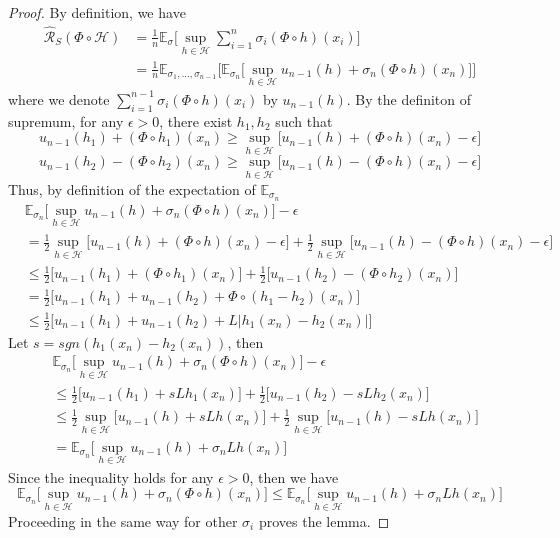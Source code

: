 \begin{proof}
	By definition, we have
	\begin{align}
	\hat{\mathcal{R}}_S(\Phi \circ \mathcal{H}) &= \frac{1}{n} \mathbb{E}_{\sigma} \bigg[\sup_{h \in \mathcal{H}} \sum_{i=1}^{n} \sigma_i(\Phi \circ h)(x_i)\bigg] \\
	&= \frac{1}{n} \mathbb{E}_{\sigma_1,...,\sigma_{n-1}} \bigg[\mathbb{E}_{\sigma_n} \big[ \sup_{h \in \mathcal{H}} u_{n-1}(h) + \sigma_n(\Phi \circ h)(x_n)\big]\bigg]
	\end{align}
	where we denote $\sum_{i=1}^{n-1} \sigma_i(\Phi \circ h)(x_i)$ by $u_{n-1}(h)$. By the definiton of supremum, for any $\epsilon>0$, there exist $h_1, h_2$ such that
	\begin{equation}
	u_{n-1}(h_1) + (\Phi \circ h_1)(x_n) \geq \sup_{h \in \mathcal{H}} \big[u_{n-1}(h) + (\Phi \circ h)(x_n)- \epsilon \big] 
	\end{equation}
	\begin{equation}
	u_{n-1}(h_2) - (\Phi \circ h_2)(x_n) \geq \sup_{h \in \mathcal{H}} \big[u_{n-1}(h) - (\Phi \circ h)(x_n)- \epsilon \big] 
	\end{equation}
	Thus, by definition of the expectation of $\mathbb{E}_{\sigma_n}$
	\begin{align}
	& \mathbb{E}_{\sigma_n} \big[ \sup_{h \in \mathcal{H}} u_{n-1}(h) + \sigma_n(\Phi \circ h)(x_n)\big] -\epsilon \\
	&= \frac{1}{2}\sup_{h \in \mathcal{H}} \big[u_{n-1}(h) + (\Phi \circ h)(x_n)  -\epsilon \big] + \frac{1}{2}\sup_{h \in \mathcal{H}} \big[u_{n-1}(h) - (\Phi \circ h)(x_n) -\epsilon \big] \\
	&\leq \frac{1}{2}\big[u_{n-1}(h_1) + (\Phi \circ h_1)(x_n)\big] +\frac{1}{2}\big[u_{n-1}(h_2) - (\Phi \circ h_2)(x_n)\big] \\
	& = \frac{1}{2}\big[u_{n-1}(h_1) + u_{n-1}(h_2) + \Phi \circ(h_1-h_2)(x_n)\big] \\
	&\leq \frac{1}{2}\big[u_{n-1}(h_1) + u_{n-1}(h_2) + L|h_1(x_n)-h_2(x_n)|\big]
	\end{align}
	Let $s=sgn(h_1(x_n)-h_2(x_n))$, then
	\begin{align}
	& \mathbb{E}_{\sigma_n} \big[ \sup_{h \in \mathcal{H}} u_{n-1}(h) + \sigma_n(\Phi \circ h)(x_n)\big] -\epsilon \\
	& \leq \frac{1}{2}\big[u_{n-1}(h_1) + sLh_1(x_n)\big] +\frac{1}{2}\big[u_{n-1}(h_2) - sLh_2(x_n)\big] \\
	&\leq  \frac{1}{2} \sup_{h \in \mathcal{H}} \big[u_{n-1}(h) + sLh(x_n)\big] +\frac{1}{2} \sup_{h \in \mathcal{H}} \big[u_{n-1}(h) - sLh(x_n)\big] \\
	&= \mathbb{E}_{\sigma_n} \big[ \sup_{h \in \mathcal{H}} u_{n-1}(h) + \sigma_n Lh(x_n)\big]
	\end{align}
	Since the inequality holds for any $\epsilon>0$, then we have
	\begin{equation}
	\mathbb{E}_{\sigma_n} \big[ \sup_{h \in \mathcal{H}} u_{n-1}(h) + \sigma_n(\Phi \circ h)(x_n)\big] \leq \mathbb{E}_{\sigma_n} \big[ \sup_{h \in \mathcal{H}} u_{n-1}(h) + \sigma_n Lh(x_n)\big]
	\end{equation}
	Proceeding in the same way for other $\sigma_i$ proves the lemma.
\end{proof}

